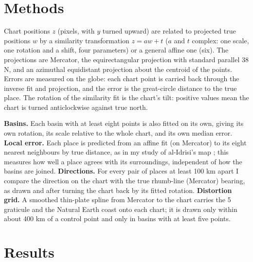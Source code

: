 \documentclass[11pt,a4paper]{article}
\begin{document}
\section{Methods}\label{sec:methods}
Chart positions $z$ (pixels, with $y$ turned upward) are related to projected true positions $w$ by a similarity transformation $z = aw + t$ ($a$ and $t$ complex: one scale, one rotation and a shift, four parameters) or a general affine one (six). The projections are Mercator, the equirectangular projection with standard parallel 38\textdegree{} N, and an azimuthal equidistant projection about the centroid of the points. Errors are measured on the globe: each chart point is carried back through the inverse fit and projection, and the error is the great-circle distance to the true place. The rotation of the similarity fit is the chart's tilt: positive values mean the chart is turned anticlockwise against true north.

\textbf{Basins.} Each basin with at least eight points is also fitted on its own, giving its own rotation, its scale relative to the whole chart, and its own median error. \textbf{Local error.} Each place is predicted from an affine fit (on Mercator) to its eight nearest neighbours by true distance, as in my study of al-Idrisi's map \citep{hotham_idrisi}; this measures how well a place agrees with its surroundings, independent of how the basins are joined. \textbf{Directions.} For every pair of places at least 100 km apart I compare the direction on the chart with the true rhumb-line (Mercator) bearing, as drawn and after turning the chart back by its fitted rotation. \textbf{Distortion grid.} A smoothed thin-plate spline from Mercator to the chart carries the 5\textdegree{} graticule and the Natural Earth coast onto each chart; it is drawn only within about 400 km of a control point and only in basins with at least five points.

\section{Results}\label{sec:results}
\end{document}
